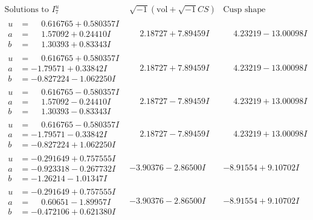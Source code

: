 \documentclass[1p]{elsarticle_modified}
\theoremstyle{definition}
\newcommand{\I}{\sqrt{-1}}
\begin{document}
$$\begin{array}{c|c|c}  
\text{Solutions to }I^u_{7}& \I (\text{vol} + \sqrt{-1}CS) & \text{Cusp shape}\\
 \hline 
\begin{aligned}
u &= \phantom{-}0.616765 + 0.580357 I \\
a &= \phantom{-}1.57092 + 0.24410 I \\
b &= \phantom{-}1.30393 + 0.83343 I\end{aligned}
 & \phantom{-}2.18727 + 7.89459 I & \phantom{-}4.23219 - 13.00098 I \\ \hline\begin{aligned}
u &= \phantom{-}0.616765 + 0.580357 I \\
a &= -1.79571 + 0.33842 I \\
b &= -0.827224 - 1.062250 I\end{aligned}
 & \phantom{-}2.18727 + 7.89459 I & \phantom{-}4.23219 - 13.00098 I \\ \hline\begin{aligned}
u &= \phantom{-}0.616765 - 0.580357 I \\
a &= \phantom{-}1.57092 - 0.24410 I \\
b &= \phantom{-}1.30393 - 0.83343 I\end{aligned}
 & \phantom{-}2.18727 - 7.89459 I & \phantom{-}4.23219 + 13.00098 I \\ \hline\begin{aligned}
u &= \phantom{-}0.616765 - 0.580357 I \\
a &= -1.79571 - 0.33842 I \\
b &= -0.827224 + 1.062250 I\end{aligned}
 & \phantom{-}2.18727 - 7.89459 I & \phantom{-}4.23219 + 13.00098 I \\ \hline\begin{aligned}
u &= -0.291649 + 0.757555 I \\
a &= -0.923318 - 0.267732 I \\
b &= -1.26214 - 1.01347 I\end{aligned}
 & -3.90376 - 2.86500 I & -8.91554 + 9.10702 I \\ \hline\begin{aligned}
u &= -0.291649 + 0.757555 I \\
a &= \phantom{-}0.60651 - 1.89957 I \\
b &= -0.472106 + 0.621380 I\end{aligned}
 & -3.90376 - 2.86500 I & -8.91554 + 9.10702 I \\ \hline\begin{aligned}

\end{aligned}
\end{array}$$
\end{document}

